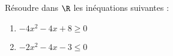 \documentclass[a4paper,11pt,exos]{nsi} %
\begin{document}



\maketitle

\begin{exercice}
    Résoudre dans $\R$ les inéquations suivantes :
    \begin{multicols}{2}
        \begin{enumerate}
            \item $-4x^2-4x+8\geq 0$
	        \item $-2x^2-4x-3\leq 0$
        \end{enumerate}
    \end{multicols}
    
\end{exercice}
\end{document}
